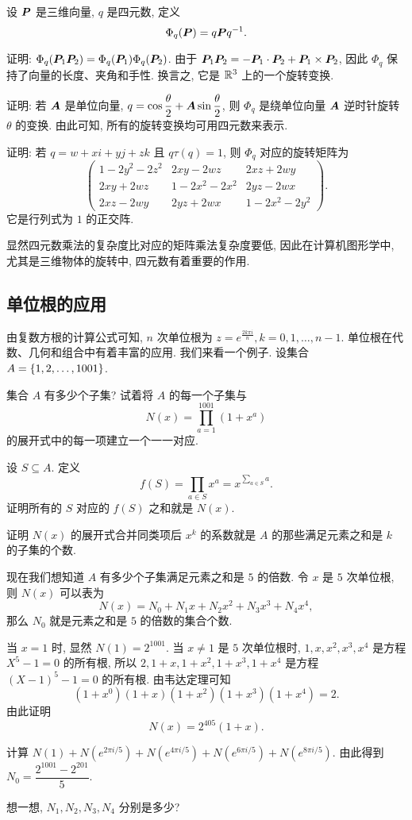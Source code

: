 \begin{exlist}
  \item 设 ${\boldsymbol{P}}$ 是三维向量, $q$ 是四元数, 定义
  \[\Phi_q({\boldsymbol{P}})=q{\boldsymbol{P}} q^{-1}.\]
  \begin{exlist}
    \item 证明: $\Phi_q({\boldsymbol{P}}_1{\boldsymbol{P}}_2)=\Phi_q({\boldsymbol{P}}_1)\Phi_q({\boldsymbol{P}}_2)$.
    由于 ${\boldsymbol{P}}_1{\boldsymbol{P}}_2=-{\boldsymbol{P}}_1\cdot{\boldsymbol{P}}_2+{\boldsymbol{P}}_1\times{\boldsymbol{P}}_2$, 因此 $\Phi_q$ 保持了向量的长度、夹角和手性. 换言之, 它是 ${\mathbb{R}}^3$ 上的一个旋转变换.
    \item 证明: 若 ${\boldsymbol{A}}$ 是单位向量, $q=\cos\dfrac\theta2+{\boldsymbol{A}}\sin\dfrac\theta2$, 则 $\Phi_q$ 是绕单位向量 ${\boldsymbol{A}}$ 逆时针旋转 $\theta$ 的变换.
    由此可知, 所有的旋转变换均可用四元数来表示.
    \item 证明: 若 $q=w+xi+yj+zk$ 且 $q\tau(q)=1$, 则 $\Phi_q$ 对应的旋转矩阵为
    \[\begin{pmatrix}
      1-2y^2-2z^2&2xy-2wz&2xz+2wy\\
      2xy+2wz&1-2x^2-2x^2&2yz-2wx\\
      2xz-2wy&2yz+2wx&1-2x^2-2y^2
    \end{pmatrix}.\]
    它是行列式为 $1$ 的正交阵.
  \end{exlist}
  显然四元数乘法的复杂度比对应的矩阵乘法复杂度要低, 因此在计算机图形学中, 尤其是三维物体的旋转中, 四元数有着重要的作用.
\end{exlist}



\subsection{单位根的应用}
由复数方根的计算公式可知, $n$ 次单位根为 $z=e^{\frac{2k\pi i}n},k=0,1,\dots,n-1$.
单位根在代数、几何和组合中有着丰富的应用. 我们来看一个例子.
设集合 $A={\left\{1,2,\dots,1001\right\}}$.
\begin{exlist}
  \item 集合 $A$ 有多少个子集? 试着将 $A$ 的每一个子集与
  \[N(x)=\prod_{a=1}^{1001}(1+x^a)\]
  的展开式中的每一项建立一个一一对应.
  \item 设 $S\subseteq A$. 定义
  \[f(S)=\prod_{a\in S}x^a=x^{\sum_{a\in S}a}.\]
  证明所有的 $S$ 对应的 $f(S)$ 之和就是 $N(x)$.
  \item 证明 $N(x)$ 的展开式合并同类项后 $x^k$ 的系数就是 $A$ 的那些满足元素之和是 $k$ 的子集的个数.
  \item 现在我们想知道 $A$ 有多少个子集满足元素之和是 $5$ 的倍数.
令 $x$ 是 $5$ 次单位根, 则 $N(x)$ 可以表为
\[N(x)=N_0+N_1x+N_2x^2+N_3x^3+N_4x^4,\]
  那么 $N_0$ 就是元素之和是 $5$ 的倍数的集合个数.
  \item 当 $x=1$ 时, 显然 $N(1)=2^{1001}$.
  当 $x\neq 1$ 是 $5$ 次单位根时, $1,x,x^2,x^3,x^4$ 是方程 $X^5-1=0$ 的所有根, 所以 $2,1+x,1+x^2,1+x^3,1+x^4$ 是方程 $(X-1)^5-1=0$ 的所有根. 由韦达定理可知
  \[(1+x^0)(1+x)(1+x^2)(1+x^3)(1+x^4)=2.\]
  由此证明
  \[N(x)=2^{405}(1+x).\]
  \item 计算 $N(1)+N(e^{2\pi i/5})+N(e^{4\pi i/5})+N(e^{6\pi i/5})+N(e^{8\pi i/5})$. 由此得到 $N_0=\dfrac{2^{1001}-2^{201}}5$.
  \item 想一想, $N_1,N_2,N_3,N_4$ 分别是多少?
\end{exlist}




